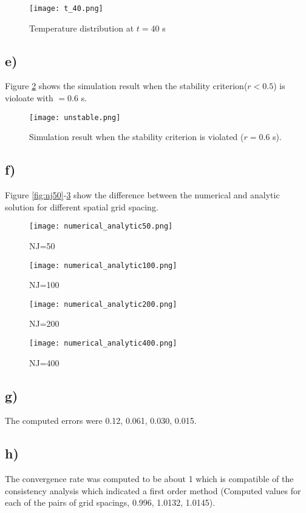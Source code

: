 \documentclass{article}
\begin{document}
\begin{figure}
	\texttt{[image: t\_40.png]}
	\caption{Temperature distribution at $t=40$ s}
	\label{fig:t40}
\end{figure}

\subsection*{e)}
Figure \ref{fig:unstable} shows the simulation result when the stability criterion($r<0.5$) is violoate with  $=0.6$ s.

\begin{figure}
	\texttt{[image: unstable.png]}
	\caption{Simulation result when the stability criterion is violated ($r=0.6$ s).}
	\label{fig:unstable}
\end{figure}

\subsection*{f)}


Figure \ref{fig:nj50}-\ref{fig:nj400} show the difference between the numerical and analytic solution for different spatial grid spacing.

\begin{figure}[h!]
\begin{minipage}{0.55\textwidth}
            \texttt{[image: numerical\_analytic50.png]}
            \caption{\small NJ=50}
            \label{fig:nj50}
\end{minipage}
\begin{minipage}{0.55\textwidth}
            \texttt{[image: numerical\_analytic100.png]}
            \caption{\small NJ=100}
            \label{fig:nj100}
\end{minipage}
\begin{minipage}{0.55\textwidth}
            \texttt{[image: numerical\_analytic200.png]}
            \caption{\small NJ=200}
            \label{fig:nj200}
\end{minipage}
\begin{minipage}{0.55\textwidth}
            \texttt{[image: numerical\_analytic400.png]}
            \caption{\small NJ=400}
            \label{fig:nj400}
\end{minipage}
\end{figure}

\subsection*{g)}
The computed errors were 0.12, 0.061, 0.030, 0.015.

\subsection*{h)}
The convergence rate was computed to be about 1 which is compatible of the consistency analysis which indicated a first order method (Computed values for each of the pairs of grid spacings, 0.996, 1.0132, 1.0145).

\clearpage
\newpage


\end{document}
